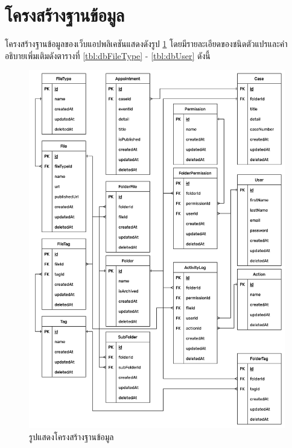 \documentclass[12pt,oneside,openright,a4paper]{cpe-thai-project}
\begin{document}
\section{โครงสร้างฐานข้อมูล}
\hspace*{1cm}โครงสร้างฐานข้อมูลของเว็บแอปพลิเคชันแสดงดังรูป \ref{fig:erDiagram} โดยมีรายละเอียดของชนิดตัวแปรและคํา
อธิบายเพิ่มเติมดังตารางที่ \ref{tbl:dbFileType} - \ref{tbl:dbUser} ดังนี้
\begin{figure}[!ht]\centering
    \includegraphics[width=15cm]{./assets/er-diagram.png}
    \caption{รูปแสดงโครงสร้างฐานข้อมูล}\label{fig:erDiagram}
\end{figure}
\end{document}
